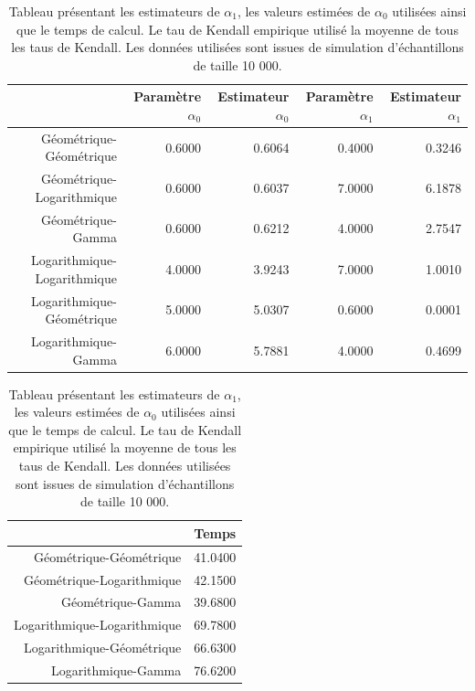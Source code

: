 \documentclass{article}
\begin{document}
	
	\begin{table}[H]
		\centering
		\begin{tabular}{rrrrr}
			\hline
			& Paramètre $\alpha_{0}$ & Estimateur $\alpha_{0}$ & Paramètre $\alpha_{1}$ & Estimateur $\alpha_{1}$  \\  
			\hline
			Géométrique-Géométrique & 0.6000 & 0.6064 & 0.4000 & 0.3246 \\ 
			Géométrique-Logarithmique & 0.6000 & 0.6037 & 7.0000 & 6.1878 \\ 
			Géométrique-Gamma & 0.6000 & 0.6212 & 4.0000 & 2.7547  \\ 
			Logarithmique-Logarithmique & 4.0000 & 3.9243 & 7.0000 & 1.0010  \\ 
			Logarithmique-Géométrique & 5.0000 & 5.0307 & 0.6000 & 0.0001 \\ 
			Logarithmique-Gamma & 6.0000 & 5.7881 & 4.0000 & 0.4699 \\ 
			\hline
		\end{tabular}
		\begin{tabular}{rr}
			\hline
			 & Temps \\  
			\hline
			Géométrique-Géométrique & 41.0400 \\ 
			Géométrique-Logarithmique & 42.1500 \\ 
			Géométrique-Gamma & 39.6800 \\ 
			Logarithmique-Logarithmique  & 69.7800 \\ 
			Logarithmique-Géométrique  & 66.6300 \\ 
			Logarithmique-Gamma  & 76.6200 \\ 
			\hline
		\end{tabular}
		\caption{Tableau présentant les estimateurs de $\alpha_{1}$, les valeurs estimées de $\alpha_{0}$ utilisées ainsi que le temps de calcul. Le tau de Kendall empirique utilisé la moyenne de tous les taus de Kendall. Les données utilisées sont issues de simulation d’échantillons de taille 10 000.}
		\label{resultats_alpha1tous}
	\end{table}
\end{document}

